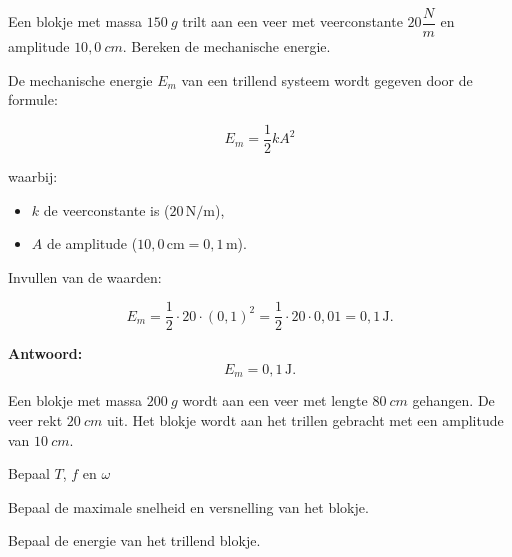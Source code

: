 \documentclass{ximera}
\begin{document}

\begin{exercise} 
    Een blokje met massa $150 \ g$ trilt aan een veer met veerconstante $20 \dfrac{N}{m}$ en amplitude $10,0 \ cm$. 
    Bereken de mechanische energie.
    \begin{oplossing}


De mechanische energie \( E_m \) van een trillend systeem wordt gegeven door de formule:

\[
E_m = \frac{1}{2} k A^2
\]

waarbij:
\begin{itemize}
    \item \( k \) de veerconstante is (\( 20 \, \text{N/m} \)),
    \item \( A \) de amplitude (\( 10,0 \, \text{cm} = 0,1 \, \text{m} \)).
\end{itemize}

Invullen van de waarden:

\[
E_m = \frac{1}{2} \cdot 20 \cdot (0,1)^2 = \frac{1}{2} \cdot 20 \cdot 0,01 = 0,1 \, \text{J}.
\]

\textbf{Antwoord:}
\[
E_m = 0,1 \, \text{J}.
\]
    \end{oplossing}
\end{exercise}

\begin{exercise} 
    Een blokje met massa $200 \ g$ wordt aan een veer met lengte $80 \ cm$ gehangen. De veer rekt $20 \ cm$ uit. 
    Het blokje wordt aan het trillen gebracht met een amplitude van $10 \ cm$.
        \begin{question}
	   Bepaal $T$, $f$ en $\omega$
        \end{question}

        \begin{question}
        Bepaal de maximale snelheid en versnelling van het blokje. 
        \end{question}

        \begin{question}
          Bepaal de energie van het trillend blokje.  
        \end{question}
\end{exercise}
\end{document}
